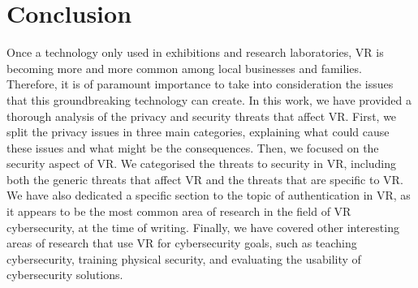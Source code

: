 \documentclass[journal]{IEEEtran}
\begin{document}




\section{Conclusion}\label{sec:conclusion}
Once a technology only used in exhibitions and research laboratories, VR is becoming more and more common among local businesses and families. Therefore, it is of paramount importance to take into consideration the issues that this groundbreaking technology can create. In this work, we have provided a thorough analysis of the privacy and security threats that affect VR. First, we split the privacy issues in three main categories, explaining what could cause these issues and what might be the consequences. Then, we focused on the security aspect of VR. We categorised the threats to security in VR, including both the generic threats that affect VR and the threats that are specific to VR. We have also dedicated a specific section to the topic of authentication in VR, as it appears to be the most common area of research in the field of VR cybersecurity, at the time of writing. Finally, we have covered other interesting areas of research that use VR for cybersecurity goals, such as teaching cybersecurity, training physical security, and evaluating the usability of cybersecurity solutions.



\balance

\end{document}
